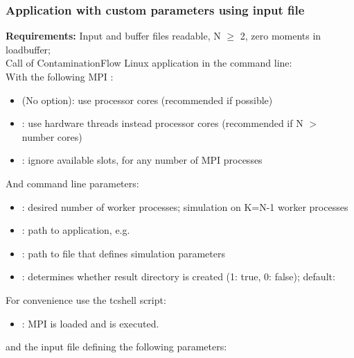 \subsubsection{Application with custom parameters using input file}
\textbf{Requirements:} Input and buffer files readable, N $\geq$ 2, zero moments in loadbuffer;\\[4pt]
Call of ContaminationFlow Linux application in the command line:
\leavevmode\\[-8pt]
With the following MPI :
\begin{itemize}[noitemsep,topsep=0pt, partopsep=0pt]
\item  (No option): use processor cores (recommended if possible)
\item {}: use hardware threads instead processor cores (recommended if N $>$ number cores)
\item {}: ignore available slots, for any number of MPI processes
\end{itemize}
\bigskip
And command line parameters:
\begin{itemize}[noitemsep,topsep=0pt, partopsep=0pt]
\item {}: desired number of worker processes; simulation on K=N-1 worker processes
\item {}: path to application, e.g.\ 
\item {}: path to file that defines simulation parameters
\item {}: determines whether result directory is created (1: true, 0: false); default:
\end{itemize}
\bigskip
For convenience use the tcshell script:
\begin{itemize}[noitemsep,topsep=0pt, partopsep=0pt]
	\item {}: MPI is loaded and  is executed.
\end{itemize}
\bigskip
and the input file defining the following parameters:

